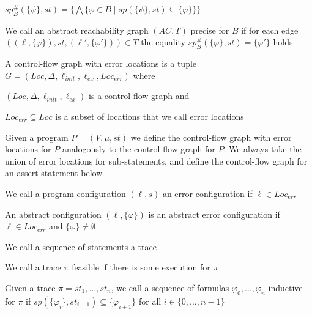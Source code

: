 \documentclass[landscape, a4paper]{article}
\begin{document}
\begin{minipage}[t]{0.2\linewidth}
\begin{betterlist}
		\begin{betterlist}
			\item $sp^\#_B(\{ \psi \} , st) = \{\bigwedge \{\varphi \in B \mid sp(\{ \psi \}, st) \subseteq \{ \varphi \}\}\}$
		\end{betterlist}
		\item We call an abstract reachability graph $(AC, T)$ \alert{precise for $B$} if for each edge $((\ell, \{\varphi\}), st, (\ell', \{\varphi'\})) \in T$ the equality $sp^\#_B(\{\varphi\}, st) = \{\varphi'\}$ holds
	\end{betterlist}
\end{minipage}
\begin{minipage}[t]{0.2\linewidth}
	\begin{betterlist}
		\item A \alert{control-flow graph with error locations} is a tuple $G = (Loc, \Delta, \ell_{init}, \ell_{ex}, Loc_{err})$ where
		\begin{betterlist}
			\item $(Loc, \Delta, \ell_{init}, \ell_{ex})$ is a control-flow graph and
			\item $Loc_{err} \subseteq Loc$ is a subset of locations that we call \alert{error locations}
		\end{betterlist}
		\item Given a program $P = (V, \mu, st)$ we define the \alert{control-flow graph with error locations for $P$} analogously to the control-flow graph for $P$. We always take the union of error locations for sub-statements, and define the control-flow graph for an assert statement below
		\begin{betterlist}
			\item {}
		\end{betterlist}
		\item We call a program configuration $(\ell, s)$ an \alert{error configuration} if $\ell \in Loc_{err}$
		\item An abstract configuration $(\ell, \{\varphi\})$ is an \alert{abstract error configuration} if $\ell \in Loc_{err}$ and $\{\varphi\}\ne \emptyset$
		\item We call a sequence of statements a \alert{trace}
		\begin{betterlist}
			\item We call a trace $\pi$ \alert{feasible} if there is some execution for $\pi$
		\end{betterlist}
		\item Given a trace $\pi = st_1, \ldots, st_n$, we call a sequence of formulas $\varphi_0, . . . , \varphi_n$ \alert{inductive for $\pi$} if $sp(\{\varphi_i\}, st_{i+1}) \subseteq \{\varphi_{i+1}\}$ for all $i \in \{0, \ldots, n−1\}$ %

\end{betterlist}
\end{minipage}
\end{document}
